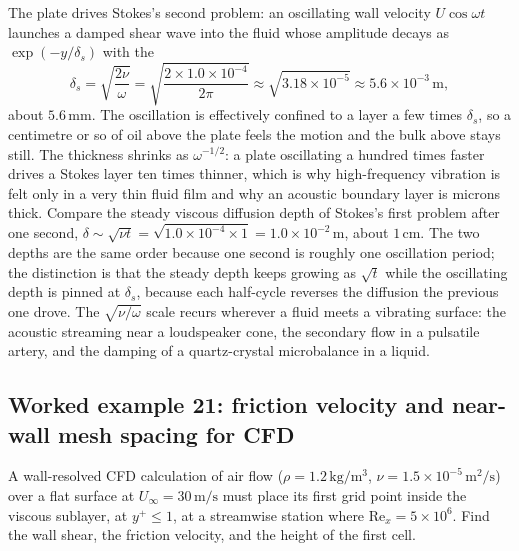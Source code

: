 The plate drives Stokes's second problem: an oscillating wall velocity
$U\cos\omega t$ launches a damped shear wave into the fluid whose
amplitude decays as $\exp(-y/\delta_s)$ with the 
\[
\delta_s = \sqrt{\frac{2\nu}{\omega}} = \sqrt{\frac{2\times1.0\times
10^{-4}}{2\pi}} \approx \sqrt{3.18\times10^{-5}} \approx 5.6\times
10^{-3}\,\si{\meter},
\]
about $5.6\,\si{\milli\meter}$. The oscillation is effectively confined
to a layer a few times $\delta_s$, so a centimetre or so of oil above
the plate feels the motion and the bulk above stays still. The
thickness shrinks as $\omega^{-1/2}$: a plate oscillating a hundred
times faster drives a Stokes layer ten times thinner, which is why
high-frequency vibration is felt only in a very thin fluid film and why
an acoustic boundary layer is microns thick. Compare the steady viscous
diffusion depth of Stokes's first problem after one second, $\delta
\sim \sqrt{\nu t} = \sqrt{1.0\times10^{-4}\times1} = 1.0\times10^{-2}
\,\si{\meter}$, about $1\,\si{\centi\meter}$. The two depths are the
same order because one second is roughly one oscillation period; the
distinction is that the steady depth keeps growing as $\sqrt{t}$ while
the oscillating depth is pinned at $\delta_s$, because each half-cycle
reverses the diffusion the previous one drove. The $\sqrt{\nu/\omega}$
scale recurs wherever a fluid meets a vibrating surface: the acoustic
streaming near a loudspeaker cone, the secondary flow in a pulsatile
artery, and the damping of a quartz-crystal microbalance in a liquid.

\subsection*{Worked example 21: friction velocity and near-wall mesh spacing for CFD}

A wall-resolved CFD calculation of air flow ($\rho = 1.2\,\si{\kilogram
\per\meter\cubed}$, $\nu = 1.5\times10^{-5}\,\si{\meter}^2/\si{\second}$)
over a flat surface at $U_\infty = 30\,\si{\meter\per\second}$ must
place its first grid point inside the viscous sublayer, at $y^+ \le 1$,
at a streamwise station where $\text{Re}_x = 5\times10^{6}$. Find the
wall shear, the friction velocity, and the height of the first cell.


